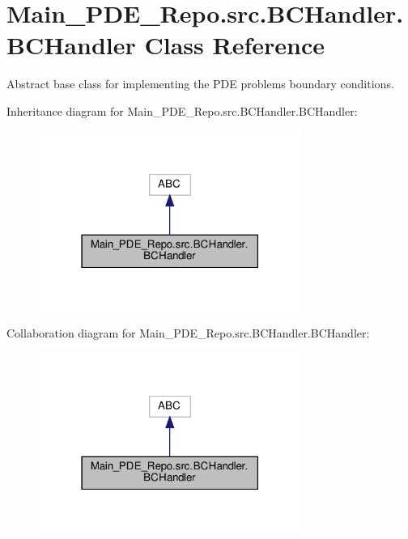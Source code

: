 \hypertarget{classMain__PDE__Repo_1_1src_1_1BCHandler_1_1BCHandler}{}\section{Main\+\_\+\+P\+D\+E\+\_\+\+Repo.\+src.\+B\+C\+Handler.\+B\+C\+Handler Class Reference}
\label{classMain__PDE__Repo_1_1src_1_1BCHandler_1_1BCHandler}


Abstract base class for implementing the P\+DE problem\textquotesingle{}s boundary conditions.  




Inheritance diagram for Main\+\_\+\+P\+D\+E\+\_\+\+Repo.\+src.\+B\+C\+Handler.\+B\+C\+Handler\+:
\nopagebreak
\begin{figure}[H]
\begin{center}
\leavevmode
\includegraphics[width=243pt]{classMain__PDE__Repo_1_1src_1_1BCHandler_1_1BCHandler__inherit__graph}
\end{center}
\end{figure}


Collaboration diagram for Main\+\_\+\+P\+D\+E\+\_\+\+Repo.\+src.\+B\+C\+Handler.\+B\+C\+Handler\+:
\nopagebreak
\begin{figure}[H]
\begin{center}
\leavevmode
\includegraphics[width=243pt]{classMain__PDE__Repo_1_1src_1_1BCHandler_1_1BCHandler__coll__graph}
\end{center}
\end{figure}
